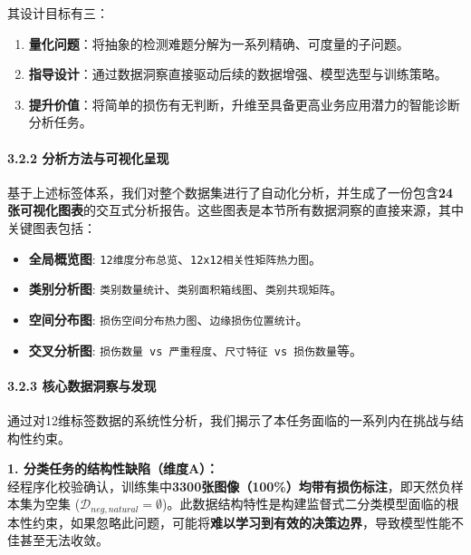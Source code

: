 \documentclass[
]{article}
\begin{document}
其设计目标有三：

\begin{enumerate}
\def\labelenumi{\arabic{enumi}.}
\item
  \textbf{量化问题}：将抽象的检测难题分解为一系列精确、可度量的子问题。
\item
  \textbf{指导设计}：通过数据洞察直接驱动后续的数据增强、模型选型与训练策略。
\item
  \textbf{提升价值}：将简单的损伤有无判断，升维至具备更高业务应用潜力的智能诊断分析任务。
\end{enumerate}

\paragraph{\texorpdfstring{\textbf{3.2.2
分析方法与可视化呈现}}{3.2.2 分析方法与可视化呈现}}\label{322-ux5206ux6790ux65b9ux6cd5ux4e0eux53efux89c6ux5316ux5448ux73b0}

基于上述标签体系，我们对整个数据集进行了自动化分析，并生成了一份包含\textbf{24张可视化图表}的交互式分析报告。这些图表是本节所有数据洞察的直接来源，其中关键图表包括：

\begin{itemize}
\item
  \textbf{全局概览图}:
  \texttt{12维度分布总览}、\texttt{12x12相关性矩阵热力图}。
\item
  \textbf{类别分析图}:
  \texttt{类别数量统计}、\texttt{类别面积箱线图}、\texttt{类别共现矩阵}。
\item
  \textbf{空间分布图}:
  \texttt{损伤空间分布热力图}、\texttt{边缘损伤位置统计}。
\item
  \textbf{交叉分析图}:
  \texttt{损伤数量\ vs\ 严重程度}、\texttt{尺寸特征\ vs\ 损伤数量}等。
\end{itemize}

\paragraph{\texorpdfstring{\textbf{3.2.3
核心数据洞察与发现}}{3.2.3 核心数据洞察与发现}}\label{323-ux6838ux5fc3ux6570ux636eux6d1eux5bdfux4e0eux53d1ux73b0}

通过对12维标签数据的系统性分析，我们揭示了本任务面临的一系列内在挑战与结构性约束。

\textbf{1. 分类任务的结构性缺陷（维度A）：} \\
经程序化校验确认，训练集中\textbf{3300张图像（100\%）均带有损伤标注}，即天然负样本集为空集
(\(\mathcal{D}_{neg, natural} = \emptyset\))。此数据结构特性是构建监督式二分类模型面临的根本性约束，如果忽略此问题，可能将\textbf{难以学习到有效的决策边界}，导致模型性能不佳甚至无法收敛。
\end{document}
